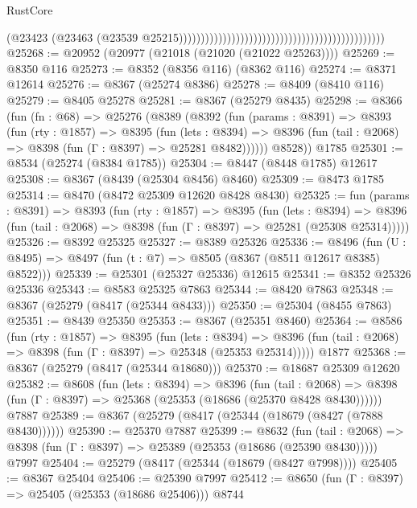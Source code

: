 \begin{lexlean}{RustCore}
\begin{coremodule}
                                                                                            (@23423
                                                                                              (@23463
                                                                                                (@23539
                                                                                                  @25215)))))))))))))))))))))))))))))))))))))))))))))))
@25268 := @20952 (@20977 (@21018 (@21020 (@21022 @25263))))
@25269 := @8350 @116
@25273 := @8352 (@8356 @116) (@8362 @116)
@25274 := @8371 @12614
@25276 := @8367 (@25274 @8386)
@25278 := @8409 (@8410 @116)
@25279 := @8405 @25278
@25281 := @8367 (@25279 @8435)
@25298 := @8366
    (fun (fn : @68) =>
    @25276
      (@8389
        (@8392
          (fun (params : @8391) =>
          @8393
            (fun (rty : @1857) =>
            @8395
              (fun (lets : @8394) =>
              @8396 (fun (tail : @2068) => @8398 (fun (Γ : @8397) => @25281 @8482))))))
        @8528))
    @1785
@25301 := @8534 (@25274 (@8384 @1785))
@25304 := @8447 (@8448 @1785) @12617
@25308 := @8367 (@8439 (@25304 @8456) @8460)
@25309 := @8473 @1785
@25314 := @8470 (@8472 @25309 @12620 @8428 @8430)
@25325 := fun (params : @8391) =>
  @8393
    (fun (rty : @1857) =>
    @8395
      (fun (lets : @8394) =>
      @8396 (fun (tail : @2068) => @8398 (fun (Γ : @8397) => @25281 (@25308 @25314)))))
@25326 := @8392 @25325
@25327 := @8389 @25326
@25336 := @8496
    (fun (U : @8495) => @8497 (fun (t : @7) => @8505 (@8367 (@8511 @12617 @8385) @8522)))
@25339 := @25301 (@25327 @25336) @12615
@25341 := @8352 @25326 @25336
@25343 := @8583 @25325 @7863
@25344 := @8420 @7863
@25348 := @8367 (@25279 (@8417 (@25344 @8433)))
@25350 := @25304 (@8455 @7863)
@25351 := @8439 @25350
@25353 := @8367 (@25351 @8460)
@25364 := @8586
    (fun (rty : @1857) =>
    @8395
      (fun (lets : @8394) =>
      @8396 (fun (tail : @2068) => @8398 (fun (Γ : @8397) => @25348 (@25353 @25314)))))
    @1877
@25368 := @8367 (@25279 (@8417 (@25344 @18680)))
@25370 := @18687 @25309 @12620
@25382 := @8608
    (fun (lets : @8394) =>
    @8396
      (fun (tail : @2068) =>
      @8398 (fun (Γ : @8397) => @25368 (@25353 (@18686 (@25370 @8428 @8430))))))
    @7887
@25389 := @8367 (@25279 (@8417 (@25344 (@18679 (@8427 (@7888 @8430))))))
@25390 := @25370 @7887
@25399 := @8632
    (fun (tail : @2068) => @8398 (fun (Γ : @8397) => @25389 (@25353 (@18686 (@25390 @8430)))))
    @7997
@25404 := @25279 (@8417 (@25344 (@18679 (@8427 @7998))))
@25405 := @8367 @25404
@25406 := @25390 @7997
@25412 := @8650 (fun (Γ : @8397) => @25405 (@25353 (@18686 @25406))) @8744

\end{coremodule}
\end{lexlean}
